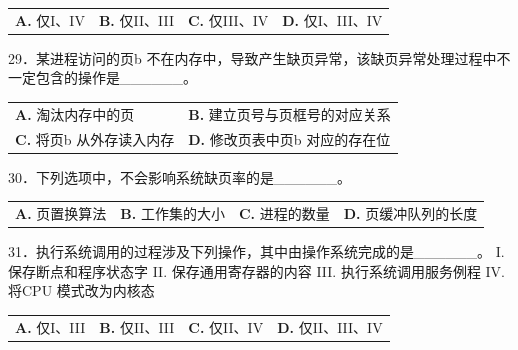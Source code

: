 \documentclass[UTF8,11pt]{ctexart}
\begin{document}
\begin{center}\begin{tabular}{>{\raggedright\arraybackslash}p{\dimexpr(\linewidth-8\tabcolsep)/4\relax}>{\raggedright\arraybackslash}p{\dimexpr(\linewidth-8\tabcolsep)/4\relax}>{\raggedright\arraybackslash}p{\dimexpr(\linewidth-8\tabcolsep)/4\relax}>{\raggedright\arraybackslash}p{\dimexpr(\linewidth-8\tabcolsep)/4\relax}}
\textbf{A.} 仅I、IV & \textbf{B.} 仅II、III & \textbf{C.} 仅III、IV & \textbf{D.} 仅I、III、IV\\[.35em]\end{tabular}\end{center}

29．某进程访问的页b 不在内存中，导致产生缺页异常，该缺页异常处理过程中不一定包含的操作是\_\_\_\_\_\_。


\begin{center}\begin{tabular}{>{\raggedright\arraybackslash}p{\dimexpr(\linewidth-4\tabcolsep)/2\relax}>{\raggedright\arraybackslash}p{\dimexpr(\linewidth-4\tabcolsep)/2\relax}}
\textbf{A.} 淘汰内存中的页 & \textbf{B.} 建立页号与页框号的对应关系\\[.35em]
\textbf{C.} 将页b 从外存读入内存 & \textbf{D.} 修改页表中页b 对应的存在位\\[.35em]\end{tabular}\end{center}

30．下列选项中，不会影响系统缺页率的是\_\_\_\_\_\_。


\begin{center}\begin{tabular}{>{\raggedright\arraybackslash}p{\dimexpr(\linewidth-8\tabcolsep)/4\relax}>{\raggedright\arraybackslash}p{\dimexpr(\linewidth-8\tabcolsep)/4\relax}>{\raggedright\arraybackslash}p{\dimexpr(\linewidth-8\tabcolsep)/4\relax}>{\raggedright\arraybackslash}p{\dimexpr(\linewidth-8\tabcolsep)/4\relax}}
\textbf{A.} 页置换算法 & \textbf{B.} 工作集的大小 & \textbf{C.} 进程的数量 & \textbf{D.} 页缓冲队列的长度\\[.35em]\end{tabular}\end{center}

31．执行系统调用的过程涉及下列操作，其中由操作系统完成的是\_\_\_\_\_\_。 I. 保存断点和程序状态字 II. 保存通用寄存器的内容 III. 执行系统调用服务例程 IV. 将CPU 模式改为内核态


\begin{center}\begin{tabular}{>{\raggedright\arraybackslash}p{\dimexpr(\linewidth-8\tabcolsep)/4\relax}>{\raggedright\arraybackslash}p{\dimexpr(\linewidth-8\tabcolsep)/4\relax}>{\raggedright\arraybackslash}p{\dimexpr(\linewidth-8\tabcolsep)/4\relax}>{\raggedright\arraybackslash}p{\dimexpr(\linewidth-8\tabcolsep)/4\relax}}
\textbf{A.} 仅I、III & \textbf{B.} 仅II、III & \textbf{C.} 仅II、IV & \textbf{D.} 仅II、III、IV\\[.35em]\end{tabular}\end{center}
\end{document}
